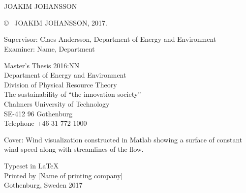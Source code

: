 \newpage
\thispagestyle{plain}
\vspace*{4.5cm}
\reportTitle{}\\
\reportSubTitle{}\\
JOAKIM JOHANSSON \setlength{\parskip}{1cm}

\copyright ~ JOAKIM JOHANSSON, 2017. \setlength{\parskip}{1cm}

Supervisor: Claes Andersson, Department of Energy and Environment\\
Examiner: Name, Department \setlength{\parskip}{1cm}

Master's Thesis 2016:NN\\	%
Department of Energy and Environment\\
Division of Physical Resource Theory\\
The sustainability of “the innovation society”\\
Chalmers University of Technology\\
SE-412 96 Gothenburg\\
Telephone +46 31 772 1000 \setlength{\parskip}{0.5cm}

\vfill
Cover: Wind visualization constructed in Matlab showing a surface of constant wind speed along with streamlines of the flow. \setlength{\parskip}{0.5cm}

Typeset in \LaTeX \\
Printed by [Name of printing company]\\
Gothenburg, Sweden 2017

